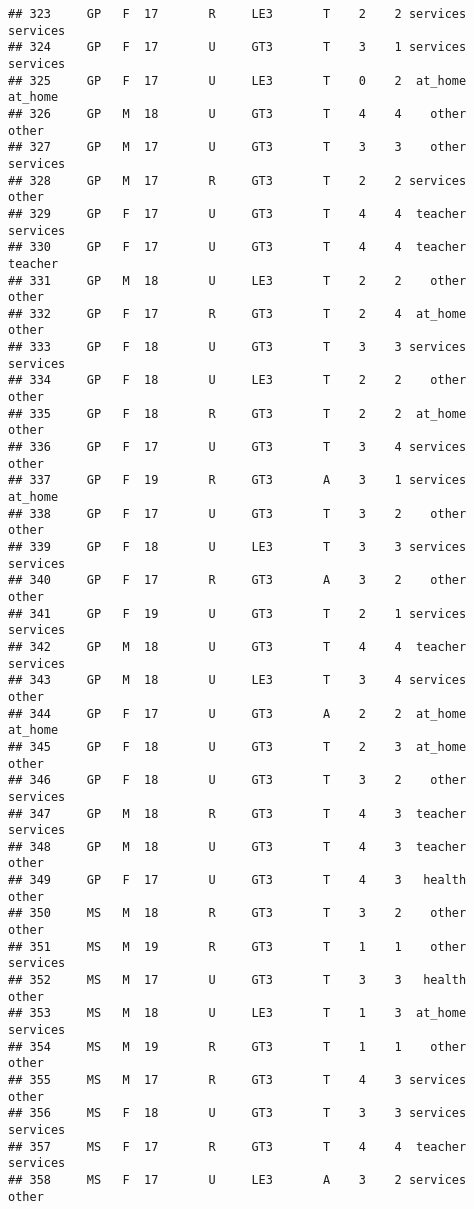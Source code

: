 \documentclass[
]{article}
\begin{document}
\begin{verbatim}
## 323     GP   F  17       R     LE3       T    2    2 services services
## 324     GP   F  17       U     GT3       T    3    1 services services
## 325     GP   F  17       U     LE3       T    0    2  at_home  at_home
## 326     GP   M  18       U     GT3       T    4    4    other    other
## 327     GP   M  17       U     GT3       T    3    3    other services
## 328     GP   M  17       R     GT3       T    2    2 services    other
## 329     GP   F  17       U     GT3       T    4    4  teacher services
## 330     GP   F  17       U     GT3       T    4    4  teacher  teacher
## 331     GP   M  18       U     LE3       T    2    2    other    other
## 332     GP   F  17       R     GT3       T    2    4  at_home    other
## 333     GP   F  18       U     GT3       T    3    3 services services
## 334     GP   F  18       U     LE3       T    2    2    other    other
## 335     GP   F  18       R     GT3       T    2    2  at_home    other
## 336     GP   F  17       U     GT3       T    3    4 services    other
## 337     GP   F  19       R     GT3       A    3    1 services  at_home
## 338     GP   F  17       U     GT3       T    3    2    other    other
## 339     GP   F  18       U     LE3       T    3    3 services services
## 340     GP   F  17       R     GT3       A    3    2    other    other
## 341     GP   F  19       U     GT3       T    2    1 services services
## 342     GP   M  18       U     GT3       T    4    4  teacher services
## 343     GP   M  18       U     LE3       T    3    4 services    other
## 344     GP   F  17       U     GT3       A    2    2  at_home  at_home
## 345     GP   F  18       U     GT3       T    2    3  at_home    other
## 346     GP   F  18       U     GT3       T    3    2    other services
## 347     GP   M  18       R     GT3       T    4    3  teacher services
## 348     GP   M  18       U     GT3       T    4    3  teacher    other
## 349     GP   F  17       U     GT3       T    4    3   health    other
## 350     MS   M  18       R     GT3       T    3    2    other    other
## 351     MS   M  19       R     GT3       T    1    1    other services
## 352     MS   M  17       U     GT3       T    3    3   health    other
## 353     MS   M  18       U     LE3       T    1    3  at_home services
## 354     MS   M  19       R     GT3       T    1    1    other    other
## 355     MS   M  17       R     GT3       T    4    3 services    other
## 356     MS   F  18       U     GT3       T    3    3 services services
## 357     MS   F  17       R     GT3       T    4    4  teacher services
## 358     MS   F  17       U     LE3       A    3    2 services    other

\end{verbatim}
\end{document}
